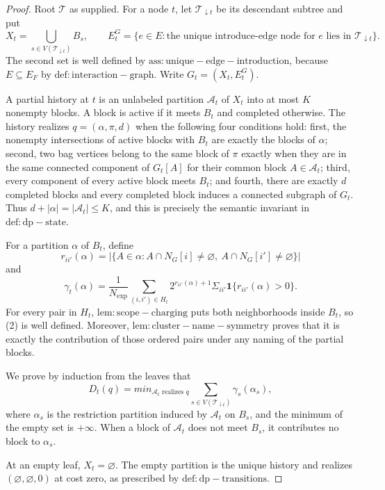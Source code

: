 \documentclass{article}
\begin{document}
\begin{proof}
Root \(\mathcal T\) as supplied.  For a node \(t\), let \(\mathcal T_{\downarrow t}\) be its descendant subtree and put
\[
 X_t=\bigcup_{s\in V(\mathcal T_{\downarrow t})}B_s,
 \qquad
 E_t^G=\{e\in E:\text{the unique introduce-edge node for }e
                   \text{ lies in }\mathcal T_{\downarrow t}\}.
\tag{1}
\]
The second set is well defined by \(\mathrm{ass:unique-edge-introduction}\), because \(E\subseteq E_F\) by \(\mathrm{def:interaction-graph}\).  Write \(G_t=(X_t,E_t^G)\).

A partial history at \(t\) is an unlabeled partition \(\mathscr A_t\) of \(X_t\) into at most \(K\) nonempty blocks.  A block is active if it meets \(B_t\) and completed otherwise.  The history realizes \(q=(\alpha,\pi,d)\) when the following four conditions hold: first, the nonempty intersections of active blocks with \(B_t\) are exactly the blocks of \(\alpha\); second, two bag vertices belong to the same block of \(\pi\) exactly when they are in the same connected component of \(G_t[A]\) for their common block \(A\in\mathscr A_t\); third, every component of every active block meets \(B_t\); and fourth, there are exactly \(d\) completed blocks and every completed block induces a connected subgraph of \(G_t\).  Thus \(d+|\alpha|=|\mathscr A_t|\le K\), and this is precisely the semantic invariant in \(\mathrm{def:dp-state}\).

For a partition \(\alpha\) of \(B_t\), define
\[
 r_{ii'}(\alpha)=
 \bigl|\{A\in\alpha:A\cap N_G[i]\ne\varnothing,
                         \ A\cap N_G[i']\ne\varnothing\}\bigr|
\]
and
\[
 \gamma_t(\alpha)=\frac{1}{N_{\exp}}
 \sum_{(i,i')\in H_t}
 2^{r_{ii'}(\alpha)+1}\Sigma_{ii'}
 \mathbf 1\{r_{ii'}(\alpha)>0\}.
\tag{2}
\]
For every pair in \(H_t\), \(\mathrm{lem:scope-charging}\) puts both neighborhoods inside \(B_t\), so (2) is well defined.  Moreover, \(\mathrm{lem:cluster-name-symmetry}\) proves that it is exactly the contribution of those ordered pairs under any naming of the partial blocks.

We prove by induction from the leaves that
\[
 D_t(q)=min_{\mathscr A_t\text{ realizes }q}
 \sum_{s\in V(\mathcal T_{\downarrow t})}
 \gamma_s(\alpha_s),
\tag{3}
\]
where \(\alpha_s\) is the restriction partition induced by \(\mathscr A_t\) on \(B_s\), and the minimum of the empty set is \(+\infty\).  When a block of \(\mathscr A_t\) does not meet \(B_s\), it contributes no block to \(\alpha_s\).

At an empty leaf, \(X_t=\varnothing\).  The empty partition is the unique history and realizes \((\varnothing,\varnothing,0)\) at cost zero, as prescribed by \(\mathrm{def:dp-transitions}\).


\end{proof}
\end{document}
